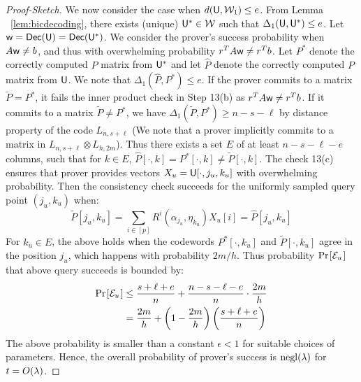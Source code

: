 \begin{proof}[Proof-Sketch]
We now consider the case when $d(\mathsf{U},\mathcal{W}_1)\leq e$. From Lemma
~\ref{lem:bicdecoding}, there exists (unique) $\mathsf{U}^*\in \mathcal{W}$
such that $\Delta_1(\mathsf{U},\mathsf{U}^*)\leq e$.
Let $\mathsf{w}=\mathsf{Dec}(\mathsf{U})=\mathsf{Dec}(\mathsf{U}^*)$. We consider the prover's success
probability when $A\mathsf{w}\neq b$, and thus with overwhelming probability $r^TA \mathsf{w} \neq
r^Tb$. Let $P^*$ denote the correctly computed $P$ matrix from $\mathsf{U}^*$ and let
$\hat{P}$ denote the correctly computed $P$ matrix from $\mathsf{U}$. We note that
$\Delta_1(\hat{P},P^*)\leq e$. If the 
prover commits to a matrix $\tilde{P}=P^*$, it fails the inner product check in Step
13(b) as $r^TA\mathsf{w}\neq r^Tb$. If it commits to a matrix $\tilde{P}\neq P^*$, we have
$\Delta_1(\tilde{P},P^*)\geq n-s-\ell$ by distance property of the code $L_{n, s+\ell}$
(We note that a prover implicitly commits to a matrix in $L_{n,s+\ell}\otimes L_{h,2m}$).
Thus there exists a set $E$ of at least $n-s-\ell-e$ columns, such that for
$k\in E$, $\hat{P}[\cdot,k]=P^*[\cdot,k]\neq \tilde{P}[\cdot,k]$. The check
 13(c) ensures that prover provides vectors $X_u=\mathsf{U}[\cdot,j_u,k_u]$ with
overwhelming probability. Then the consistency check succeeds for the 
uniformly sampled query point $(j_u,k_u)$ when:
\[ \tilde{P}[j_u,k_u] = \sum_{i\in [p]}R^i(\alpha_{j_u},\eta_{k_u})X_u[i] =
\hat{P}[j_u,k_u] \]
For $k_u\in E$, the above holds when the codewords $P^*[\cdot,k_u]$ and
$\tilde{P}[\cdot,k_u]$ agree in the position $j_u$, which happens with 
probability $2m/h$. Thus probability $\prob{\mc{E}_u}$ that above query succeeds is bounded by:
{\small
\begin{align*}
\prob{\mc{E}_u}&\leq \frac{s+\ell+e}{n} + \frac{n-s-\ell-e}{n}\cdot\frac{2m}{h}
\\
&= \frac{2m}{h}+\left(1-\frac{2m}{h}\right)\left(\frac{s+\ell+e}{n}\right)
\end{align*}
}
The above probability is smaller than a constant $\epsilon<1$ for suitable
choices of parameters. Hence, the overall probability of prover's success is
$\mathrm{negl}(\lambda)$ for $t=O(\lambda)$.
\end{proof}
